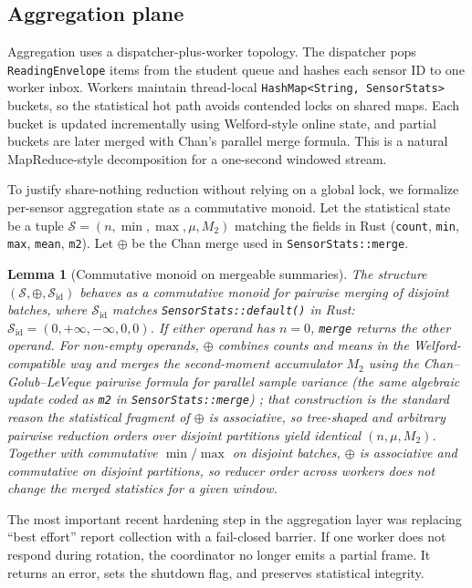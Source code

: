 \documentclass[11pt]{article}
\newtheorem{lemma}{Lemma}
\begin{document}
\subsection*{Aggregation plane}
Aggregation uses a dispatcher-plus-worker topology. The dispatcher pops \texttt{ReadingEnvelope} items from the student queue and hashes each sensor ID to one worker inbox. Workers maintain thread-local \texttt{HashMap<String, SensorStats>} buckets, so the statistical hot path avoids contended locks on shared maps. Each bucket is updated incrementally using Welford-style online state, and partial buckets are later merged with Chan's parallel merge formula. This is a natural MapReduce-style decomposition for a one-second windowed stream.

To justify share-nothing reduction without relying on a global lock, we formalize per-sensor aggregation state as a commutative monoid. Let the statistical state be a tuple $\mathcal{S} = (n, \min, \max, \mu, M_2)$ matching the fields in Rust (\texttt{count}, \texttt{min}, \texttt{max}, \texttt{mean}, \texttt{m2}). Let $\oplus$ be the Chan merge used in \texttt{SensorStats::merge}.

\begin{lemma}[Commutative monoid on mergeable summaries]
The structure $(\mathcal{S}, \oplus, \mathcal{S}_{\mathrm{id}})$ behaves as a commutative monoid for pairwise merging of disjoint batches, where $\mathcal{S}_{\mathrm{id}}$ matches \texttt{SensorStats::default()} in Rust: $\mathcal{S}_{\mathrm{id}} = (0, +\infty, -\infty, 0, 0)$. If either operand has $n=0$, \texttt{merge} returns the other operand. For non-empty operands, $\oplus$ combines counts and means in the Welford-compatible way and merges the second-moment accumulator $M_2$ using the Chan--Golub--LeVeque pairwise formula for parallel sample variance (the same algebraic update coded as \texttt{m2} in \texttt{SensorStats::merge}) \cite{chan1979}; that construction is the standard reason the statistical fragment of $\oplus$ is \emph{associative}, so tree-shaped and arbitrary pairwise reduction orders over disjoint partitions yield identical $(n,\mu,M_2)$. Together with commutative $\min/\max$ on disjoint batches, $\oplus$ is associative and commutative on disjoint partitions, so reducer order across workers does not change the merged statistics for a given window.
\end{lemma}

The most important recent hardening step in the aggregation layer was replacing ``best effort'' report collection with a fail-closed barrier. If one worker does not respond during rotation, the coordinator no longer emits a partial frame. It returns an error, sets the shutdown flag, and preserves statistical integrity.
\end{document}
